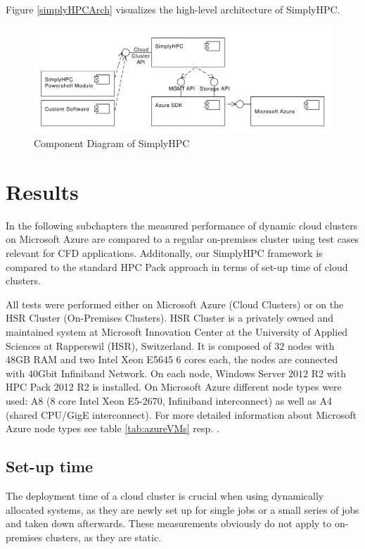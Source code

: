 \documentclass[3p,times]{elsarticle}
\begin{document}
Figure \ref{simplyHPCArch} visualizes the high-level architecture of SimplyHPC.

\begin{figure}[h]
\centering
	\includegraphics[width=.8\linewidth]{simplyHPCArch}
	\caption{Component Diagram of SimplyHPC}
	\label{fig:simplyHPCArch}
\end{figure}


\section{Results}
\label{sec:results}
In the following subchapters the measured performance of dynamic cloud clusters on Microsoft Azure are compared to a regular on-premises cluster using test cases relevant for CFD applications. Additonally, our SimplyHPC framework is compared to the standard HPC Pack approach in terms of set-up time of cloud clusters.

All tests were performed either on Microsoft Azure (Cloud Clusters) or on the HSR Cluster (On-Premises Clusters). HSR Cluster is a privately owned and maintained system at Microsoft Innovation Center at the University of Applied Sciences at Rapperswil (HSR), Switzerland. It is composed of $32$ nodes with 48GB RAM and two Intel Xeon E5645 6 cores each, the nodes are connected with 40Gbit Infiniband Network. On each node, Windows Server $2012$ R2 with HPC Pack 2012 R2 is installed.
On Microsoft Azure different node types were used: A8 (8 core Intel Xeon E5-2670, Infiniband interconnect) as well as A4 (shared CPU/GigE interconnect). For more detailed information about Microsoft Azure node types see table \ref{tab:azureVMs} resp. \cite{azure}.

\subsection{Set-up time}
The deployment time of a cloud cluster is crucial when using dynamically allocated systems, as they are newly set up for single jobs or a small series of jobs and taken down afterwards. These measurements obviously do not apply to on-premises clusters, as they are static.
\end{document}
